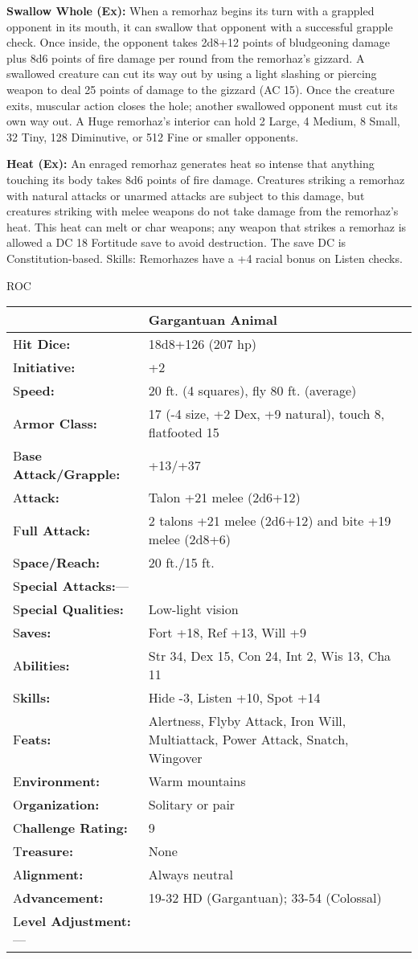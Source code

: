 \documentclass{article}
\begin{document}
\textbf{Swallow Whole (Ex): }When a remorhaz begins its turn with a grappled opponent 
in its mouth, it can swallow that opponent with a successful grapple check. Once 
inside, the opponent takes 2d8+12 points of bludgeoning damage plus 8d6 points 
of fire damage per round from the remorhaz's gizzard. A swallowed creature can 
cut its way out by using a light slashing or piercing weapon to deal 25 points 
of damage to the gizzard (AC 15). Once the creature exits, muscular action closes 
the hole; another swallowed opponent must cut its own way out. A Huge remorhaz's 
interior can hold 2 Large, 4 Medium, 8 Small, 32 Tiny, 128 Diminutive, or 512 Fine 
or smaller opponents.

\textbf{Heat (Ex):} An enraged remorhaz generates heat so intense that anything 
touching its body takes 8d6 points of fire damage. Creatures striking a remorhaz 
with natural attacks or unarmed attacks are subject to this damage, but creatures 
striking with melee weapons do not take damage from the remorhaz's heat. This heat 
can melt or char weapons; any weapon that strikes a remorhaz is allowed a DC 18 
Fortitude save to avoid destruction. The save DC is Constitution-based. Skills: 
Remorhazes have a +4 racial bonus on Listen checks.

\vspace{12pt}
{\LARGE{}ROC}

\begin{tabular}{|>{\raggedright}p{91pt}|>{\raggedright}p{231pt}|}
\hline
  & Gargantuan Animal\tabularnewline
\hline
H\textbf{it Dice:} & 18d8+126 (207 hp)\tabularnewline
\hline
I\textbf{nitiative:} & +2\tabularnewline
\hline
S\textbf{peed:} & 20 ft. (4 squares), fly 80 ft. (average)\tabularnewline
\hline
A\textbf{rmor Class:} & 17 (-4 size, +2 Dex, +9 natural), touch 8, flatfooted 15\tabularnewline
\hline
B\textbf{ase Attack/Grapple:} & +13/+37\tabularnewline
\hline
A\textbf{ttack:} & Talon +21 melee (2d6+12)\tabularnewline
\hline
F\textbf{ull Attack:} & 2 talons +21 melee (2d6+12) and bite +19 melee (2d8+6)\tabularnewline
\hline
S\textbf{pace/Reach:} & 20 ft./15 ft.\tabularnewline
\hline
S\textbf{pecial Attacks:}--- & \tabularnewline
\hline
S\textbf{pecial Qualities:} & Low-light vision\tabularnewline
\hline
S\textbf{aves:} & Fort +18, Ref +13, Will +9\tabularnewline
\hline
A\textbf{bilities:} & Str 34, Dex 15, Con 24, Int 2, Wis 13, Cha 11\tabularnewline
\hline
S\textbf{kills:} & Hide -3, Listen +10, Spot +14\tabularnewline
\hline
F\textbf{eats:} & Alertness, Flyby Attack, Iron Will, Multiattack, Power Attack, 
Snatch, Wingover \tabularnewline
\hline
E\textbf{nvironment:} & Warm mountains\tabularnewline
\hline
O\textbf{rganization:} & Solitary or pair\tabularnewline
\hline
C\textbf{hallenge Rating:} & 9\tabularnewline
\hline
T\textbf{reasure:} & None\tabularnewline
\hline
A\textbf{lignment:} & Always neutral\tabularnewline
\hline
A\textbf{dvancement:} & 19-32 HD (Gargantuan); 33-54 (Colossal)\tabularnewline
\hline
L\textbf{evel Adjustment:}--- & \tabularnewline
\hline
\end{tabular}
\end{document}
